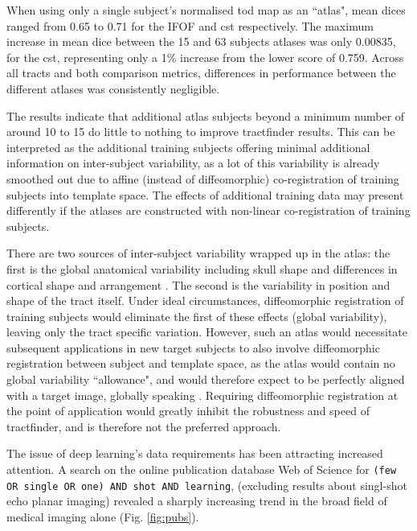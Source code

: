 When using only a single subject's normalised \gls{tod} map as an ``atlas", mean \gls{dice}s ranged from 0.65 to 0.71 for the IFOF and \gls{cst} respectively.
The maximum increase in mean \gls{dice} between the 15 and 63 subjects atlases was only 0.00835, for the \gls{cst}, representing only a 1\% increase from the lower score of 0.759.
Across all tracts and both comparison metrics, differences in performance between the different atlases was consistently negligible.

The results indicate that additional atlas subjects beyond a minimum number of around 10 to 15 do little to nothing to improve tractfinder results.
This can be interpreted as the additional training subjects offering minimal additional information on inter-subject variability, as a lot of this variability is already smoothed out due to affine (instead of diffeomorphic) co-registration of training subjects into template space.
The effects of additional training data may present differently if the atlases are constructed with non-linear co-registration of training subjects.

There are two sources of inter-subject variability wrapped up in the atlas: the first is the global anatomical variability including skull shape and differences in cortical shape and arrangement .
The second is the variability in position and shape of the tract itself.
Under ideal circumstances, diffeomorphic registration of training subjects would eliminate the first of these effects (global variability), leaving only the tract specific variation.
However, such an atlas would necessitate subsequent applications in new target subjects to also involve diffeomorphic registration between subject and template space, as the atlas would contain no global variability ``allowance", and would therefore expect to be perfectly aligned with a target image, globally speaking .
Requiring diffeomorphic registration at the point of application would greatly inhibit the robustness and speed of tractfinder, and is therefore not the preferred approach.

The issue of deep learning's data requirements has been attracting increased attention.
A search on the online publication database Web of Science for \lstinline|(few OR single OR one) AND shot AND learning|, (excluding results about singl-shot echo planar imaging) revealed a sharply increasing trend in the broad field of medical imaging alone  (Fig. \ref{fig:pubs}).

